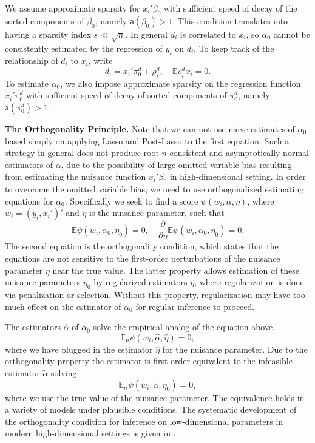 \documentclass{amsart}\usepackage[]{graphicx}\usepackage[]{color}
\begin{document}
We assume approximate sparsity for $x_i'\beta_0$ with sufficient speed of decay of the sorted components of $\beta_0$, namely $\mathsf{a}(\beta_0) >1$. This condition translates into having a sparsity index $s \ll \sqrt{n}$. In general $d_i$ is correlated to $x_i$, so $\alpha_0$ cannot be consistently estimated by the regression of $y_i$ on $d_i$. To keep track of the relationship of $d_i$ to $x_i$, write
$$
d_i = x_i'\pi^d_0 + \rho^d_i,  \quad \mathbb{E} \rho^d_i x_i = 0.
$$
To estimate $\alpha_0$, we also impose approximate sparsity on the regression function  $x_i'\pi^d_0$  with sufficient speed of decay of sorted components of $\pi^d_0$, namely $\mathsf{a}(\pi^d_0) > 1$.

\textbf{The Orthogonality Principle.} Note that we can not use naive estimates of $\alpha_0$ based simply on applying Lasso and Post-Lasso to the first equation. Such a strategy in general does not produce root-$n$ consistent and asymptotically normal estimators of $\alpha$, due to the possibility of large omitted variable bias resulting from estimating the nuisance function $x_i'\beta_0$ in high-dimensional setting. In order to overcome the omitted variable bias, we need to use orthogonalized estimating equations for $\alpha_0$. Specifically we seek to find a score $\psi(w_i, \alpha, \eta)$, where $w_i = (y_i,x_i')'$ and $\eta$ is the nuisance parameter, such that
$$
\mathbb{E} \psi(w_i, \alpha_0, \eta_0) = 0, \quad \frac{\partial}{\partial \eta} \mathbb{E} \psi(w_i, \alpha_0, \eta_0) = 0.
$$
The second equation is the orthogonality condition, which states that the equations are not sensitive to the first-order perturbations of the nuisance parameter $\eta$ near the true value.  The latter property allows estimation of these nuisance parameters $\eta_0$ by regularized estimators $\hat \eta$, where regularization is done via penalization or selection.  Without this property, regularization may have too much effect on the estimator of $\alpha_0$ for regular inference to proceed.  

The estimators $\hat \alpha$ of $\alpha_0$ solve the empirical analog
of the equation above,
$$
\mathbb{E}_n \psi(w_i, \hat \alpha, \hat \eta) = 0,
$$
where we have plugged in the estimator $\hat \eta$ for the nuisance parameter.  Due to the orthogonality property the estimator
is first-order equivalent to the infeasible estimator $\tilde \alpha$ solving 
$$
\mathbb{E}_n \psi(w_i, \tilde \alpha, \eta_0) = 0,
$$
where we use the true value of the nuisance parameter.  The equivalence holds in a variety of models under plausible conditions. The systematic development of the orthogonality condition for inference on low-dimensional parameters in modern high-dimensional settings is given in \citet{CHS2015}. 
\end{document}
